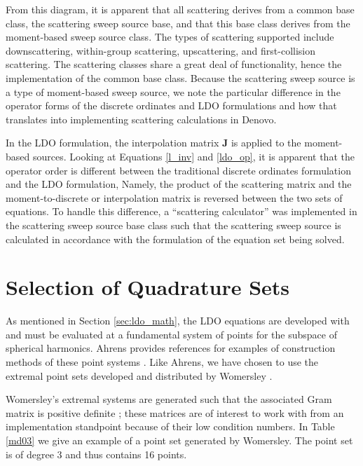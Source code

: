 From this diagram, it is apparent that all scattering derives from a common base class,
the scattering sweep source base, and that this base class derives from the 
moment-based sweep source class.
The types of scattering supported include downscattering, within-group scattering,
upscattering, and first-collision scattering. The scattering classes share a great deal
of functionality, hence the implementation of the common base class. Because the
scattering sweep source is a type 
of moment-based sweep source, we note the particular difference in the operator
forms of the discrete ordinates and LDO formulations and how that translates into 
implementing scattering calculations in Denovo.

In the LDO formulation, the interpolation matrix $\mathbf{J}$ is applied to the 
moment-based sources. Looking at Equations \ref{l_inv} and 
\ref{ldo_op}, it is apparent that the operator order is different between the 
traditional discrete ordinates formulation and the LDO formulation, Namely, the product
of the scattering matrix and the moment-to-discrete or interpolation matrix is reversed
between the two sets of equations. To handle this difference, a ``scattering 
calculator'' was implemented in the scattering sweep source base class such that the
scattering sweep source is calculated in accordance with the formulation of the
equation set being solved.

\section{Selection of Quadrature Sets}

As mentioned in Section \ref{sec:ldo_math}, the LDO equations are developed with and
must be evaluated at a fundamental system of points for the subspace of spherical
harmonics. Ahrens provides references for examples of construction methods of these
point systems \cite{ahrens}. Like Ahrens, we have chosen to use the extremal point sets
developed and distributed by Womersley \cite{wom}.

Womersley's extremal systems are generated such that the associated Gram matrix is
positive definite \cite{wom}; these matrices are of interest to work with from an
implementation standpoint because of their low condition numbers. In Table \ref{md03}
we give an example of a point set generated by Womersley. The point set is of degree 3
and thus contains 16 points.

